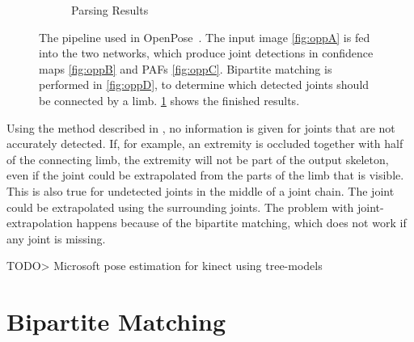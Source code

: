 \begin{figure}[h]
\begin{subfigure}[t]{0.24\textwidth}
    \caption{Parsing Results}
    \label{fig:oppE}
  \end{subfigure}
  \caption[OpenPose pipeline]{The pipeline used in OpenPose~\cite{cao2017realtime, cao2019openpose}. The input image \ref{fig:oppA} is fed into the two networks, which produce joint detections in confidence maps \ref{fig:oppB} and PAFs  \ref{fig:oppC}. Bipartite matching is performed in \ref{fig:oppD}, to determine which detected joints should be connected by a limb. \ref{fig:oppE} shows the finished results.}
  \label{fig:openpose_pipeline}
\end{figure}

Using the method described in \cite{cao2017realtime}, no information is given for joints that are not accurately detected. If, for example, an extremity is occluded together with half of the connecting limb, the extremity will not be part of the output skeleton, even if the joint could be extrapolated from the parts of the limb that is visible.
This is also true for undetected joints in the middle of a joint chain. The joint could be extrapolated using the surrounding joints. The problem with joint-extrapolation happens because of the bipartite matching, which does not work if any joint is missing.

TODO> Microsoft pose estimation for kinect using tree-models

\section{Bipartite Matching}

